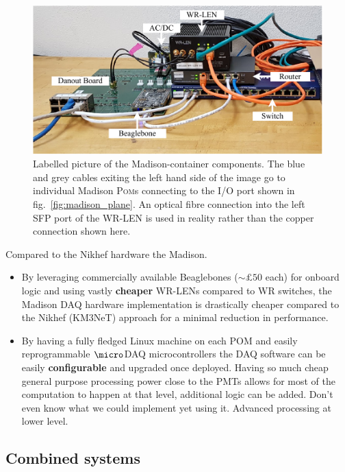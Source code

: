 \begin{figure} %
    \includegraphics[width=\textwidth]{diagrams/5-daq/madison_box.pdf}
    \caption[Labelled picture of the Madison-container components]
    {Labelled picture of the Madison-container components. The blue and grey cables exiting the
        left hand side of the image go to individual Madison \textsc{Pom}s connecting to the I/O
        port shown in fig.~\ref{fig:madison_plane}. An optical fibre connection into the left SFP
        port of the WR-LEN is used in reality rather than the copper connection shown here.}
    \label{fig:madison_box}
\end{figure}

Compared to the Nikhef hardware the Madison.
\begin{itemize}
    \item By leveraging commercially available Beaglebones ($\sim£50$ each) for onboard logic and
    using vastly \textbf{cheaper} WR-LENs compared to WR switches, the Madison DAQ hardware
    implementation is drastically cheaper compared to the Nikhef (KM3NeT) approach for a minimal
    reduction in performance.
    \item By having a fully fledged Linux machine on each POM and easily reprogrammable
    $\micro$DAQ microcontrollers the DAQ software can be easily \textbf{configurable} and upgraded
    once deployed. Having so much cheap general purpose processing power close to the PMTs allows
    for most of the computation to happen at that level, additional logic can be added. Don't even
    know what we could implement yet using it. Advanced processing at lower level. 
\end{itemize}

\subsection{Combined systems} %
\label{sec:daq_hard_combined} %

